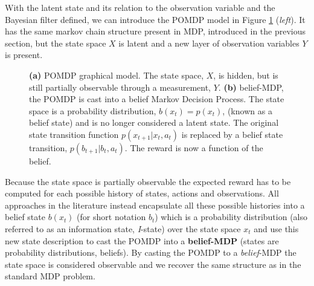 With the latent state and its relation to the observation variable and the Bayesian filter defined, we can introduce the POMDP model
in Figure \ref{fig:pomdp} (\textit{left}). It has the same markov chain structure 
present in MDP, introduced in the previous section, but the state space $X$ is latent and 
a new layer of observation variables $Y$ is present. 

\begin{figure}
 \centering
  \centering
  \caption{\textbf{(a)} POMDP graphical model. The state space, $X$, is hidden, but is still partially observable through a 
  measurement, $Y$. \textbf{(b)} belief-MDP, the POMDP is cast into a belief Markov Decision Process. The state space is 
  a probability distribution, $b(x_t) = p(x_t)$, (known as a belief state) and is no longer considered a latent state. The original state 
  transition function $p(x_{t+1}|x_t,a_t)$ is replaced by a belief state transition, $p(b_{t+1}|b_t,a_t)$. The reward 
  is now a function of the belief.}
  \label{fig:pomdp}
\end{figure}


Because the state space is partially observable the expected reward has to be computed for each possible history of states, actions and observations.
All approaches in the literature instead encapsulate all these possible histories into a belief state $b(x_t)$ (for short notation $b_t$)
which is a probability distribution (also referred to as an information state, \textit{I}-state) over the state 
space $x_t$ and use this new state description to cast the POMDP into a \textbf{belief-MDP} (states are probability distributions, 
beliefs). By casting the POMDP to a \textit{belief}-MDP the state space is considered observable and we recover the same structure 
as in the standard MDP problem.

